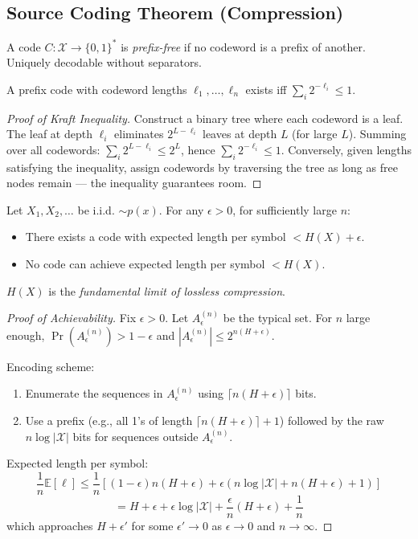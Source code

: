 \subsection{Source Coding Theorem (Compression)}
\label{sec:information:source}

\begin{definition}
A code $C: \mathcal{X} \to \{0,1\}^*$ is \emph{prefix-free} if no codeword is a prefix of another. Uniquely decodable without separators.
\end{definition}

\begin{theorem}
A prefix code with codeword lengths $\ell_1, \dots, \ell_n$ exists iff $\sum_i 2^{-\ell_i} \le 1$.
\end{theorem}

\begin{proof}[Proof of Kraft Inequality]
Construct a binary tree where each codeword is a leaf. The leaf at depth $\ell_i$ eliminates $2^{L-\ell_i}$ leaves at depth $L$ (for large $L$). Summing over all codewords: $\sum_i 2^{L-\ell_i} \le 2^L$, hence $\sum_i 2^{-\ell_i} \le 1$. Conversely, given lengths satisfying the inequality, assign codewords by traversing the tree as long as free nodes remain — the inequality guarantees room.
\end{proof}

\begin{theorem}
Let $X_1, X_2, \dots$ be i.i.d. $\sim p(x)$. For any $\epsilon > 0$, for sufficiently large $n$:
\begin{itemize}
\item There exists a code with expected length per symbol $< H(X) + \epsilon$.
\item No code can achieve expected length per symbol $< H(X)$.
\end{itemize}
$H(X)$ is the \emph{fundamental limit of lossless compression}.
\end{theorem}

\begin{proof}[Proof of Achievability]
Fix $\epsilon > 0$. Let $A_\epsilon^{(n)}$ be the typical set. For $n$ large enough, $\Pr(A_\epsilon^{(n)}) > 1-\epsilon$ and $|A_\epsilon^{(n)}| \le 2^{n(H+\epsilon)}$.

Encoding scheme:
\begin{enumerate}
\item Enumerate the sequences in $A_\epsilon^{(n)}$ using $\lceil n(H+\epsilon)\rceil$ bits.
\item Use a prefix (e.g., all 1's of length $\lceil n(H+\epsilon)\rceil+1$) followed by the raw $n\log|\mathcal{X}|$ bits for sequences outside $A_\epsilon^{(n)}$.
\end{enumerate}

Expected length per symbol:
\[
\frac{1}{n}\mathbb{E}[\ell] \le \frac{1}{n}\left[(1-\epsilon)n(H+\epsilon) + \epsilon(n\log|\mathcal{X}| + n(H+\epsilon)+1)\right]
\]
\[
= H + \epsilon + \epsilon\log|\mathcal{X}| + \frac{\epsilon}{n}(H+\epsilon) + \frac{1}{n}
\]
which approaches $H + \epsilon'$ for some $\epsilon' \to 0$ as $\epsilon \to 0$ and $n \to \infty$.
\end{proof}

